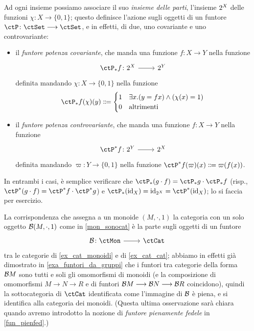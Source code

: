\begin{example}\label{ex_fun_parti}
 Ad ogni insieme possiamo associare il suo \emph{insieme delle parti}, l'insieme \(2^{X}\) delle funzioni \(\chi \colon X \to \{0,1\}\); questo definisce l'azione sugli oggetti di un funtore \(\ctP \colon \ctSet\fun\ctSet\),	e in effetti, di due, uno covariante e uno controvariante:
 \begin{itemize}
  \item il \emph{funtore potenza covariante}, che manda una funzione \(f \colon X\to Y\) nella funzione
        \[\dmFun{\ctP_* f}{\pow X}{\pow Y}\]
        definita mandando \(\chi \colon X\to \{0,1\}\) nella funzione \[\ctP_* f(\chi)(y) \defeq  \begin{cases}
          1 & \exists x . (y = fx) \land (\chi(x) = 1) \\
          0 & \text{altrimenti}                        \\
         \end{cases}\]
  \item il \emph{funtore potenza controvariante}, che manda una funzione \(f \colon X\to Y\) nella funzione
        \[\dmFun{\ctP^* f}{\pow Y}{\pow X}\]
        definita mandando \(\varpi \colon Y \to \{0,1\}\) nella funzione \(\ctP^* f(\varpi)(x) \defeq  \varpi(f(x))\).
 \end{itemize}
 In entrambi i casi, è semplice verificare che \(\ctP_* (g\cmp f) = \ctP_* g\cmp \ctP_* f\) (risp., \(\ctP^* (g\cmp f) = \ctP^* f\cmp \ctP^* g\)) e \(\ctP_*(\Id[X]) = \Id[\pow X] = \ctP^*(\Id[X])\); lo si faccia per esercizio.
\end{example}
\begin{example}\label{funtore_mon_to_cat}
 La corrispondenza che assegna a un monoide \((M,\cdot,1)\) la categoria con un solo oggetto \(\mathcal{B}(M,\cdot,1)\) come in \ref{mon_sonocat} è la parte sugli oggetti di un funtore
 \[\dmFun{\susp}{\ctMon}{\ctCat}\]
 tra le categorie di \ref{ex_cat_monoidi} e di \ref{ex_cat_cat}; abbiamo in effetti già dimostrato in \ref{exa_funtori_da_gruppi} che i funtori tra categorie della forma \(\mathcal{B} M\) sono tutti e soli gli omomorfismi di monoidi (e la composizione di omomorfismi \(M\to N\to R\) e di funtori \(\mathcal{B} M \longrightarrow\mathcal{B} N \longrightarrow\mathcal{B} R\) coincidono), quindi la sottocategoria di \(\ctCat\) identificata come l'immagine di \(\mathcal{B}\) è piena, e si identifica alla categoria dei monoidi. (Questa ultima osservazione sarà chiara quando avremo introdotto la nozione di \emph{funtore pienamente fedele} in \ref{fun_pienfed}.)
\end{example}
